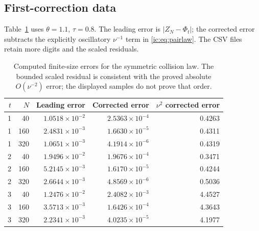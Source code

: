 \documentclass[11pt,a4paper]{article}
\numberwithin{equation}{section}
\theoremstyle{definition}
\theoremstyle{remark}
\begin{document}
\subsection{First-correction data}
Table~\ref{ic:tab:correction} uses $\theta=1.1$, $\tau=0.8$. The leading
error is $|Z_N-\Phi_t|$; the corrected error subtracts the explicitly
oscillatory $\nu^{-1}$ term in \eqref{ic:eq:pairlaw}. The CSV files retain
more digits and the scaled residuals.
\begin{table}[htbp]
\centering\small
\begin{tabular}{rrrrr}
\toprule
$t$ & $N$ & Leading error & Corrected error & $\nu^2$ corrected error\\
\midrule
1&40 &$1.0518\times10^{-2}$&$2.5363\times10^{-4}$&0.4263\\
1&160&$2.4831\times10^{-3}$&$1.6630\times10^{-5}$&0.4311\\
1&320&$1.0651\times10^{-3}$&$4.1914\times10^{-6}$&0.4319\\
2&40 &$1.9496\times10^{-2}$&$1.9676\times10^{-4}$&0.3471\\
2&160&$5.2145\times10^{-3}$&$1.6170\times10^{-5}$&0.4244\\
2&320&$2.6644\times10^{-3}$&$4.8569\times10^{-6}$&0.5036\\
3&40 &$1.2476\times10^{-2}$&$2.4082\times10^{-3}$&4.4527\\
3&160&$3.5713\times10^{-3}$&$1.6426\times10^{-4}$&4.3643\\
3&320&$2.2341\times10^{-3}$&$4.0235\times10^{-5}$&4.1977\\
\bottomrule
\end{tabular}
\caption{Computed finite-size errors for the symmetric collision law.
The bounded scaled residual is consistent with the proved absolute
$O(\nu^{-2})$ error; the displayed samples do not prove that order.}
\label{ic:tab:correction}
\end{table}
\end{document}
